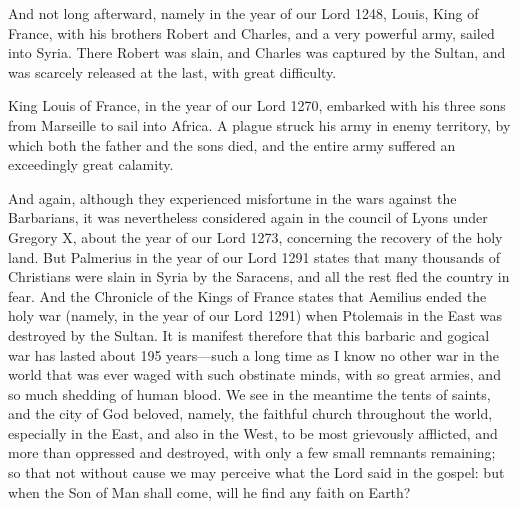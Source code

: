 And not long afterward, namely in the year of our Lord 1248, Louis, King of France, with his brothers Robert and Charles, and a very powerful army, sailed into Syria. There Robert was slain, and Charles was captured by the Sultan, and was scarcely released at the last, with great difficulty.

King Louis of France, in the year of our Lord 1270, embarked with his three sons from Marseille to sail into Africa. A plague struck his army in enemy territory, by which both the father and the sons died, and the entire army suffered an exceedingly great calamity.

And again, although they experienced misfortune in the wars against the Barbarians, it was nevertheless considered again in the council of Lyons under Gregory X, about the year of our Lord 1273, concerning the recovery of the holy land. But Palmerius in the year of our Lord 1291 states that many thousands of Christians were slain in Syria by the Saracens, and all the rest fled the country in fear. And the Chronicle of the Kings of France states that Aemilius ended the holy war (namely, in the year of our Lord 1291) when Ptolemais in the East was destroyed by the Sultan. It is manifest therefore that this barbaric and gogical war has lasted about 195 years—such a long time as I know no other war in the world that was ever waged with such obstinate minds, with so great armies, and so much shedding of human blood. We see in the meantime the tents of saints, and the city of God beloved, namely, the faithful church throughout the world, especially in the East, and also in the West, to be most grievously afflicted, and more than oppressed and destroyed, with only a few small remnants remaining; so that not without cause we may perceive what the Lord said in the gospel: but when the Son of Man shall come, will he find any faith on Earth?

